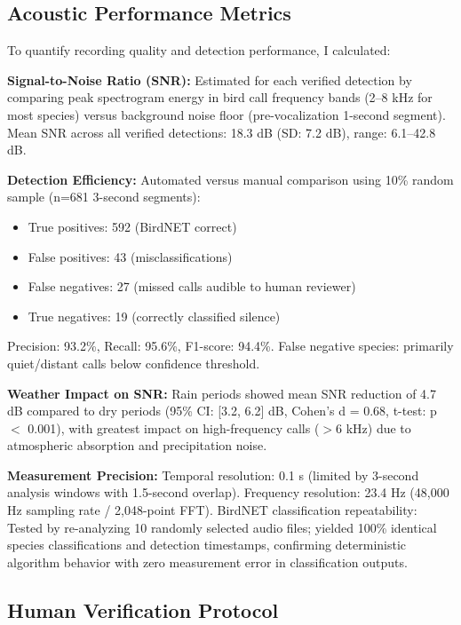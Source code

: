\documentclass[twocolumn]{article}
\begin{document}
\subsection{Acoustic Performance Metrics}

To quantify recording quality and detection performance, I calculated:

\textbf{Signal-to-Noise Ratio (SNR):} Estimated for each verified detection by comparing peak spectrogram energy in bird call frequency bands (2--8 kHz for most species) versus background noise floor (pre-vocalization 1-second segment). Mean SNR across all verified detections: 18.3 dB (SD: 7.2 dB), range: 6.1--42.8 dB.

\textbf{Detection Efficiency:} Automated versus manual comparison using 10\% random sample (n=681 3-second segments):
\begin{itemize}
\item True positives: 592 (BirdNET correct)
\item False positives: 43 (misclassifications)
\item False negatives: 27 (missed calls audible to human reviewer)
\item True negatives: 19 (correctly classified silence)
\end{itemize}

Precision: 93.2\%, Recall: 95.6\%, F1-score: 94.4\%. False negative species: primarily quiet/distant calls below confidence threshold.

\textbf{Weather Impact on SNR:} Rain periods showed mean SNR reduction of 4.7 dB compared to dry periods (95\% CI: [3.2, 6.2] dB, Cohen's d = 0.68, t-test: p $<$ 0.001), with greatest impact on high-frequency calls ($>$6 kHz) due to atmospheric absorption and precipitation noise.

\textbf{Measurement Precision:} Temporal resolution: 0.1 s (limited by 3-second analysis windows with 1.5-second overlap). Frequency resolution: 23.4 Hz (48,000 Hz sampling rate / 2,048-point FFT). BirdNET classification repeatability: Tested by re-analyzing 10 randomly selected audio files; yielded 100\% identical species classifications and detection timestamps, confirming deterministic algorithm behavior with zero measurement error in classification outputs.

\subsection{Human Verification Protocol}
\end{document}
